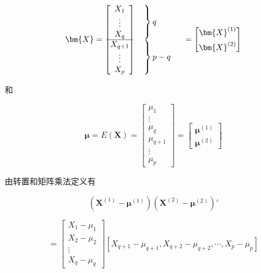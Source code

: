 
\[
\bm{X}=\begin{bmatrix}X_1\\\vdots\\X_q\\\hline X_{q+1}\\\vdots\\X_p\end{bmatrix}\ \begin{array}{l}\left.\vphantom{\begin{array}{c}X_1\\\vdots\\X_q\end{array}}\right\}q\\[1ex]\left.\vphantom{\begin{array}{c}X_{q+1}\\\vdots\\X_p\end{array}}\right\}p-q\end{array}\quad=\begin{bmatrix}\bm{X}^{(1)}\\[1ex]\bm{X}^{(2)}\end{bmatrix}
\]

和

\label{eq:2-38}
\begin{equation}
\bm{\mu}=E(\bm{X})=\begin{bmatrix}\mu_1\\\vdots\\\mu_q\\\hline\mu_{q+1}\\\vdots\\\mu_p\end{bmatrix}=\begin{bmatrix}\bm{\mu}^{(1)}\\[1ex]\bm{\mu}^{(2)}\end{bmatrix} \tag{2-38}
\end{equation}

由转置和矩阵乘法定义有

\[
(\bm{X}^{(1)}-\bm{\mu}^{(1)})(\bm{X}^{(2)}-\bm{\mu}^{(2)})'
\]

\[
=\begin{bmatrix}X_1-\mu_1\\X_2-\mu_2\\\vdots\\X_q-\mu_q\end{bmatrix}[X_{q+1}-\mu_{q+1},X_{q+2}-\mu_{q+2},\cdots,X_p-\mu_p]
\]

